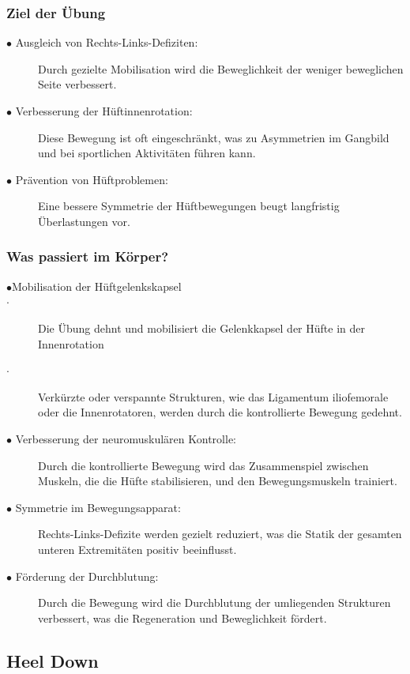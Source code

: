 \subsubsection{Ziel der Übung}

\begin{description}
        \item[$\bullet$ Ausgleich von Rechts-Links-Defiziten:]  Durch gezielte Mobilisation wird die Beweglichkeit der weniger beweglichen Seite verbessert.
        \item[$\bullet$ Verbesserung der Hüftinnenrotation:]  Diese Bewegung ist oft eingeschränkt, was zu Asymmetrien im Gangbild und bei sportlichen Aktivitäten führen kann.
        \item[$\bullet$ Prävention von Hüftproblemen:]  Eine bessere Symmetrie der Hüftbewegungen beugt langfristig Überlastungen vor.
\end{description}

\subsubsection{Was passiert im Körper?}
\begin{description}
    \item[$\bullet$Mobilisation der Hüftgelenkskapsel]
        \item[$\cdot$]Die Übung dehnt und mobilisiert die Gelenkkapsel der Hüfte in der Innenrotation
        \item[$\cdot$] Verkürzte oder verspannte Strukturen, wie das Ligamentum iliofemorale oder die Innenrotatoren, werden durch die kontrollierte Bewegung gedehnt.
    \item[$\bullet$ Verbesserung der neuromuskulären Kontrolle:] Durch die kontrollierte Bewegung wird das Zusammenspiel zwischen Muskeln, die die Hüfte stabilisieren, und den Bewegungsmuskeln trainiert.
    \item[$\bullet$ Symmetrie im Bewegungsapparat:] Rechts-Links-Defizite werden gezielt reduziert, was die Statik der gesamten unteren Extremitäten positiv beeinflusst.
    \item[$\bullet$ Förderung der Durchblutung:] Durch die Bewegung wird die Durchblutung der umliegenden Strukturen verbessert, was die Regeneration und Beweglichkeit fördert.

\end{description}

\subsection{Heel Down}

